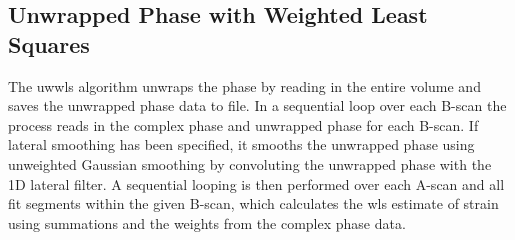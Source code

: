 \subsection{Unwrapped Phase with Weighted Least Squares}
The \ac{uwwls} algorithm unwraps the phase by reading in the entire volume and saves the unwrapped phase data to file. In a sequential loop over each B-scan the process reads in the complex phase and unwrapped phase for each B-scan. If lateral smoothing has been specified, it smooths the unwrapped phase using unweighted Gaussian smoothing by convoluting the unwrapped phase with the 1D lateral filter. A sequential looping is then performed over each A-scan and all fit segments within the given B-scan, which calculates the \ac{wls} estimate of strain using summations and the weights from the complex phase data.

